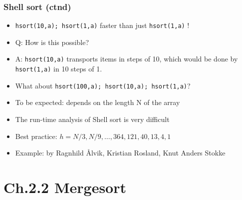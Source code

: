\documentclass[handout]{beamer}
\begin{document}
\begin{frame}[fragile]
    \frametitle{Shell sort (ctnd)}

\begin{itemize}[<+->]
\item {\tt hsort(10,a); hsort(1,a)} faster than just {\tt hsort(1,a)} !
\item Q: How is this possible?
\item A: {\tt hsort(10,a)} transports items in steps of 10, 
which would be done by {\tt hsort(1,a)} in 10 steps of 1.
\item What about {\tt hsort(100,a); hsort(10,a); hsort(1,a)}?
\item To be expected: depends on the length N of the array
\item The run-time analysis of Shell sort  is very difficult
\item Best practice: $h=N/3,N/9,\ldots,364,121,40,13,4,1$
\item Example: \href{https://bitbucket.org/algoritmevisualisering/algoritmevisualisering}%
{{\color{red}{algoritmevisualisering}}} by Ragnhild \AA lvik, Kristian Rosland, Knut Anders Stokke
\end{itemize}     
\end{frame}



\section{Ch.2.2 Mergesort}
\end{document}
